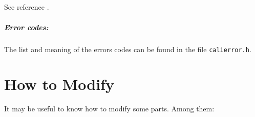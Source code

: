 \paragraph{}
 See reference \cite{Matsumoto:1998}.

\paragraph{\textbf{Error codes:}}
The list and meaning of the errors codes can be found
in the file \texttt{calierror.h}.

\chapter{How to Modify }

It may be useful to know how to modify some parts.
Among them:

